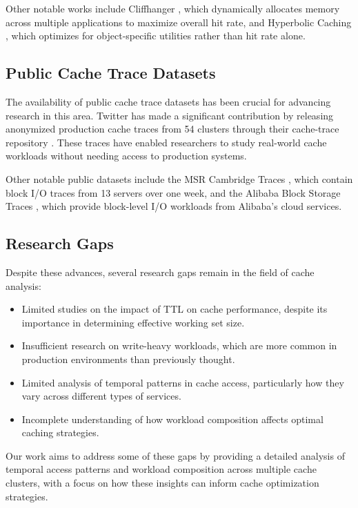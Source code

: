 \documentclass[conference]{IEEEtran}
\begin{document}
Other notable works include Cliffhanger \cite{cidon2016cliffhanger}, which dynamically allocates memory across multiple applications to maximize overall hit rate, and Hyperbolic Caching \cite{blankstein2017hyperbolic}, which optimizes for object-specific utilities rather than hit rate alone.

\subsection{Public Cache Trace Datasets}
The availability of public cache trace datasets has been crucial for advancing research in this area. Twitter has made a significant contribution by releasing anonymized production cache traces from 54 clusters through their cache-trace repository \cite{twitter_cache_trace}. These traces have enabled researchers to study real-world cache workloads without needing access to production systems.

Other notable public datasets include the MSR Cambridge Traces \cite{narayanan2008write}, which contain block I/O traces from 13 servers over one week, and the Alibaba Block Storage Traces \cite{cao2020characterizing}, which provide block-level I/O workloads from Alibaba's cloud services.

\subsection{Research Gaps}
Despite these advances, several research gaps remain in the field of cache analysis:

\begin{itemize}
    \item Limited studies on the impact of TTL on cache performance, despite its importance in determining effective working set size.
    \item Insufficient research on write-heavy workloads, which are more common in production environments than previously thought.
    \item Limited analysis of temporal patterns in cache access, particularly how they vary across different types of services.
    \item Incomplete understanding of how workload composition affects optimal caching strategies.
\end{itemize}

Our work aims to address some of these gaps by providing a detailed analysis of temporal access patterns and workload composition across multiple cache clusters, with a focus on how these insights can inform cache optimization strategies.
\end{document}
